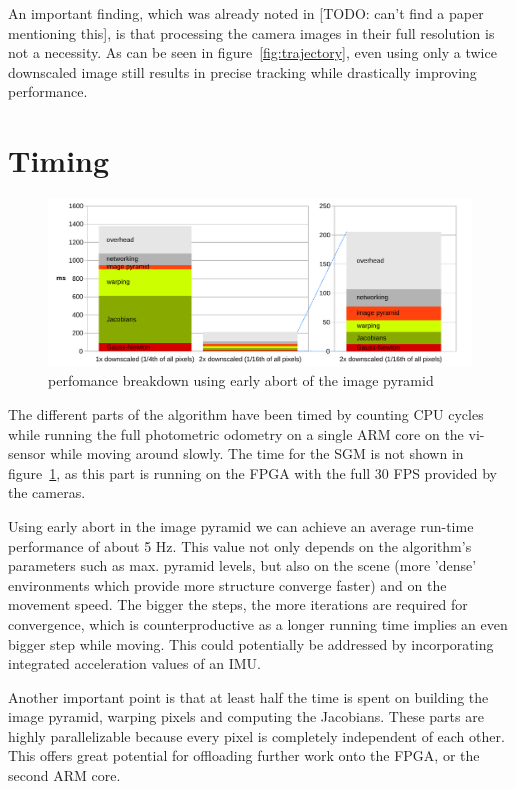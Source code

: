 An important finding, which was already noted in [TODO: can't find a paper
mentioning this], is that processing the camera images in their full resolution
is not a necessity. As can be seen in figure~\ref{fig:trajectory}, even using
only a twice downscaled image still results in precise tracking while
drastically improving performance.


\section{Timing}
\label{sec:timing}

\begin{figure}
    \centering
    \includegraphics[width=\textwidth]{images/timing.pdf}
    \caption{perfomance breakdown using early abort of the image pyramid}
    \label{fig:timing}
\end{figure}

The different parts of the algorithm have been timed by counting CPU cycles
while running the full photometric odometry on a single ARM core on the
vi-sensor while moving around slowly. The time for the SGM is not shown in
figure~\ref{fig:timing}, as this part is running on the FPGA with the full 30
FPS provided by the cameras.

Using early abort in the image pyramid we can achieve an average run-time
performance of about 5 Hz.
This value not only depends on the algorithm's parameters such as max. pyramid
levels, but also on the scene (more 'dense' environments which provide more
structure converge faster) and on the movement speed. The bigger the steps, the
more iterations are required for convergence, which is counterproductive as a
longer running time implies an even bigger step while moving. This could
potentially be addressed by incorporating integrated acceleration values of an
IMU.

Another important point is that at least half the time is spent on building the
image pyramid, warping pixels and computing the Jacobians. These parts are
highly parallelizable because every pixel is completely independent of each
other. This offers great potential for offloading further work onto the FPGA,
or the second ARM core.
